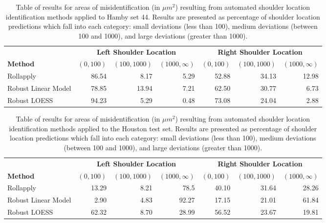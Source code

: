 \documentclass[12pt]{article}
\begin{document}
\begin{table}[]
\centering
\begin{tabular}{lrrr|rrr}
& \multicolumn{3}{c}{\textbf{Left Shoulder Location}} & \multicolumn{3}{c}{\textbf{Right Shoulder Location}} \\
\textbf{Method} & $(0,100)$ & $ (100, 1000) $ & $(1000, \infty)$ & $(0,100)$ & $ (100, 1000) $ & $(1000, \infty)$ \\ \hline
Rollapply & 86.54 & 8.17 & 5.29 & 52.88& 34.13&12.98  \\ \hline
Robust Linear Model & 78.85 & 13.94 & 7.21 & 62.50 & 30.77&6.73 \\ \hline
Robust LOESS & 94.23 & 5.29 & 0.48 & 73.08& 24.04&2.88\\ \hline \hline
\end{tabular}
\caption{Table of results for areas of misidentification (in $\mu m^2$) resulting from automated shoulder location identification methods applied to Hamby set 44. Results are presented as percentage of shoulder location predictions which fall into each category: small deviations (less than 100), medium deviations (between 100 and 1000), and large deviations (greater than 1000).}
\label{results-table}
\end{table}

\begin{table}[]
\centering
\begin{tabular}{lrrr|rrr}
& \multicolumn{3}{c}{\textbf{Left Shoulder Location}} & \multicolumn{3}{c}{\textbf{Right Shoulder Location}} \\
\textbf{Method} & $(0,100)$ & $ (100, 1000) $ & $(1000, \infty)$ & $(0,100)$ & $ (100, 1000) $ & $(1000, \infty)$ \\ \hline
Rollapply & 13.29 & 8.21 & 78.5 & 40.10 & 31.64&28.26  \\ \hline
Robust Linear Model & 2.90 & 4.83 & 92.27 & 17.15 & 21.01&61.84 \\ \hline
Robust LOESS & 62.32 & 8.70 & 28.99 & 56.52& 23.67&19.81\\ \hline \hline
\end{tabular}
\caption{Table of results for areas of misidentification (in $\mu m^2$) resulting from automated shoulder location identification methods applied to the Houston test set. Results are presented as percentage of shoulder location predictions which fall into each category: small deviations (less than 100), medium deviations (between 100 and 1000), and large deviations (greater than 1000).}
\label{results-table-houston}
\end{table}
\end{document}
